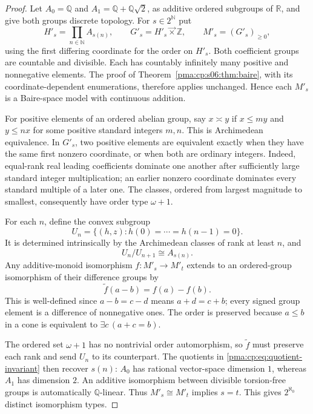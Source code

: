 \documentclass[11pt]{article}
\numberwithin{equation}{section}
\theoremstyle{definition}
\theoremstyle{remark}
\newcommand{\N}{\mathbb N}
\newcommand{\Z}{\mathbb Z}
\newcommand{\Q}{\mathbb Q}
\newcommand{\R}{\mathbb R}
\newcommand{\lex}{\mathbin{\overrightarrow\times}}
\begin{document}
\begin{proof}
Let $A_0=\Q$ and $A_1=\Q+\Q\sqrt2$, as additive ordered subgroups of
$\R$, and give both groups discrete topology. For $s\in2^{\N}$ put
\[
 H'_s=\prod_{n\in\N} A_{s(n)},\qquad
 G'_s=H'_s\lex\Z,\qquad M'_s=(G'_s)_{\geq0},
\]
using the first differing coordinate for the order on $H'_s$.
Both coefficient groups are countable and divisible. Each has
countably infinitely many positive and nonnegative elements.
The proof of Theorem~\ref{pma:cp:s06:thm:baire}, with its coordinate-dependent
enumerations, therefore applies unchanged. Hence each $M'_s$ is a
Baire-space model with continuous addition.

For positive elements of an ordered abelian group, say $x\asymp y$
if $x\leq my$ and $y\leq nx$ for some positive standard integers $m,n$.
This is Archimedean equivalence. In $G'_s$, two positive elements are
equivalent exactly when they have the same first nonzero coordinate,
or when both are ordinary integers. Indeed, equal-rank real leading
coefficients dominate one another after sufficiently large standard
integer multiplication; an earlier nonzero coordinate dominates every
standard multiple of a later one. The classes, ordered from largest
magnitude to smallest, consequently have order type $\omega+1$.

For each $n$, define the convex subgroup
\[
 U_n=\{(h,z):h(0)=\cdots=h(n-1)=0\}.
\]
It is determined intrinsically by the Archimedean classes of rank at
least $n$, and
\begin{equation}
 U_n/U_{n+1}\cong A_{s(n)}.
 \label{pma:cp:eq:quotient-invariant}
\end{equation}
Any additive-monoid isomorphism $f:M'_s\to M'_t$ extends to an ordered-group
isomorphism of their difference groups by
\[
 \widetilde f(a-b)=f(a)-f(b).
\]
This is well-defined since $a-b=c-d$ means $a+d=c+b$; every signed group
element is a difference of nonnegative ones. The order is preserved
because $a\leq b$ in a cone is equivalent to
$\exists c\,(a+c=b)$.

The ordered set $\omega+1$ has no nontrivial order automorphism, so
$\widetilde f$ must preserve each rank and send $U_n$ to its counterpart.
The quotients in \eqref{pma:cp:eq:quotient-invariant} then recover $s(n)$:
$A_0$ has rational vector-space dimension $1$, whereas $A_1$ has
dimension $2$. An additive isomorphism between divisible torsion-free
groups is automatically $\Q$-linear. Thus $M'_s\cong M'_t$ implies $s=t$.
This gives $2^{\aleph_0}$ distinct isomorphism types.


\end{proof}
\end{document}
